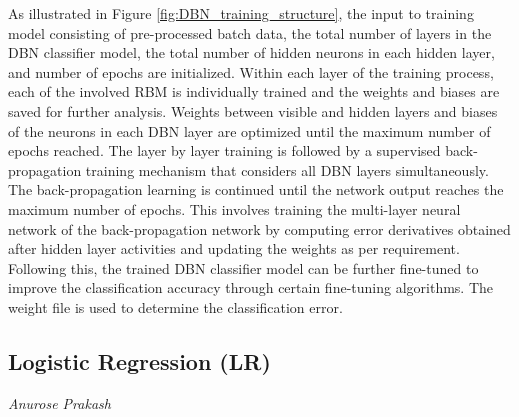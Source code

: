 As illustrated in Figure \ref{fig:DBN_training_structure}, the input to training model consisting of pre-processed batch data, the total number of layers in the DBN classifier model, the total number of hidden neurons in each hidden layer, and number of epochs are initialized. Within each layer of the training process, each of the involved RBM is individually trained and the weights and biases are saved for further analysis. Weights between visible and hidden layers and biases of the neurons in each DBN layer are optimized until the maximum number of epochs reached. The layer by layer training is followed by a supervised back-propagation training mechanism that considers all DBN layers simultaneously. The back-propagation learning is continued until the network output reaches the maximum number of epochs. This involves training the multi-layer neural network of the back-propagation network by computing error derivatives obtained after hidden layer activities and updating the weights as per requirement. Following this, the trained DBN classifier model can be further fine-tuned to improve the classification accuracy through certain fine-tuning algorithms. The weight file is used to determine the classification error.

\subsection{Logistic Regression (LR)}
\vspace*{-12mm}\hfill{\normalsize\emph{Anurose Prakash}}

